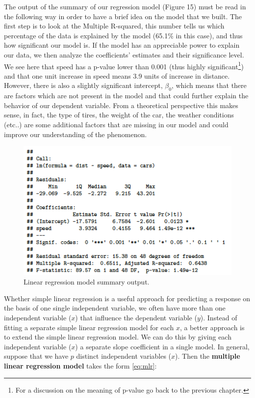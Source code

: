 \documentclass[
]{svmono}
\begin{document}
The output of the summary of our regression model (Figure 15) must be
read in the following way in order to have a brief idea on the model
that we built. The first step is to look at the Multiple R-squared, this
number tells us which percentage of the data is explained by the model
(65.1\% in this case), and thus how significant our model is. If the
model has an appreciable power to explain our data, we then analyze the
coefficients' estimates and their significance level. We see here that
speed has a p-value lower than 0.001 (thus highly significant\footnote{For a discussion on the meaning of p-value go back to the previous
  chapter.}) and
that one unit increase in speed means 3.9 units of increase in distance.
However, there is also a slightly significant intercept, \(\beta_0\),
which means that there are factors which are not present in the model
and that could further explain the behavior of our dependent variable.
From a theoretical perspective this makes sense, in fact, the type of
tires, the weight of the car, the weather conditions (etc..) are some
additional factors that are missing in our model and could improve our
understanding of the phenomenon.

\begin{figure}[H]

{\centering \includegraphics[width=0.5\linewidth,]{images/Schermata 2022-07-07 alle 17.24.44} 

}

\caption{Linear regression model summary output.}\label{fig:unnamed-chunk-76}
\end{figure}

Whether simple linear regression is a useful approach for predicting a
response on the basis of one single independent variable, we often have
more than one independent variable (\(x\)) that influence the dependent
variable (\(y\)). Instead of fitting a separate simple linear regression
model for each \(x\), a better approach is to extend the simple linear
regression model. We can do this by giving each independent variable
(\(x\)) a separate slope coefficient in a single model. In general,
suppose that we have \(p\) distinct independent variables (\(x\)). Then the
\textbf{multiple linear regression model} takes the form \eqref{eq:mlr}:
\end{document}
